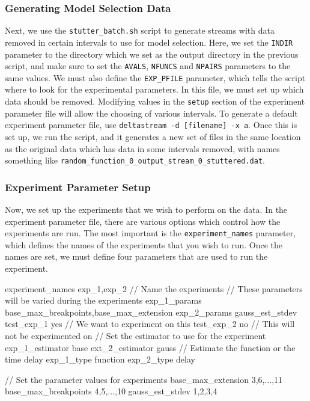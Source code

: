 \documentclass[a4paper,11pt]{article}
\begin{document}
\begin{appendices}
\subsubsection{Generating Model Selection Data}
\label{sec-10-3-2}

Next, we use the \texttt{stutter\_batch.sh} script to generate streams with data
removed in certain intervals to use for model selection. Here, we set the
\texttt{INDIR} parameter to the directory which we set as the output directory
in the previous script, and make sure to set the \texttt{AVALS}, \texttt{NFUNCS}
and \texttt{NPAIRS} parameters to the same values. We must also define the
\texttt{EXP\_PFILE} parameter, which tells the script where to look for the
experimental parameters. In this file, we must set up which data should be
removed. Modifying values in the \texttt{setup} section of the experiment
parameter file will allow the choosing of various intervals. To generate a
default experiment parameter file, use \texttt{deltastream -d [filename] -x
a}. Once this is set up, we run the script, and it generates a new set of files
in the same location as the original data which has data in some intervals
removed, with names something like \texttt{random\_function\_0\_output\_stream\_0\_stuttered.dat}.
\subsubsection{Experiment Parameter Setup}
\label{sec-10-3-3}

Now, we set up the experiments that we wish to perform on the data. In the
experiment parameter file, there are various options which control how the
experiments are run. The most important is the \texttt{experiment\_names}
parameter, which defines the names of the experiments that you wish to run. Once
the names are set, we must define four parameters that are used to run the experiment.
\small
\begin{verbatimtab}
experiment_names exp_1,exp_2 // Name the experiments
// These parameters will be varied during the experiments
exp_1_params base_max_breakpoints,base_max_extension
exp_2_params gauss_est_stdev
test_exp_1 yes // We want to experiment on this
test_exp_2 no // This will not be experimented on
// Set the estimator to use for the experiment
exp_1_estimator base 
ext_2_estimator gauss
// Estimate the function or the time delay
exp_1_type function
exp_2_type delay

// Set the parameter values for experiments
base_max_extension 3,6,...,11
base_max_breakpoints 4,5,...,10
gauss_est_stdev 1,2,3,4


\end{verbatimtab}
\end{appendices}
\end{document}
